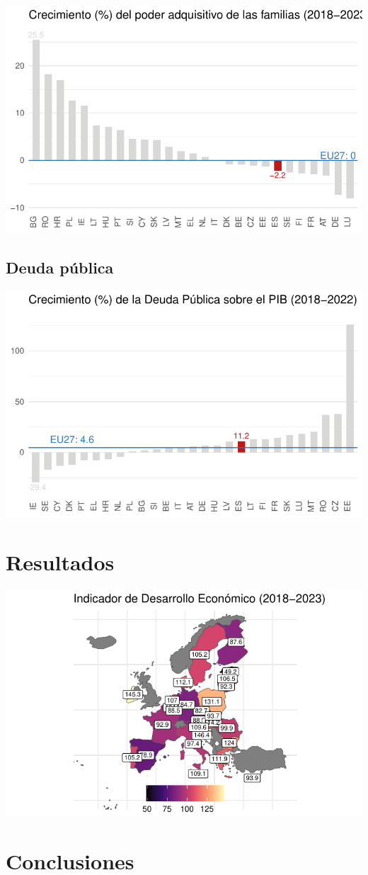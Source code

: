 \documentclass[
  letterpaper,
  DIV=11,
  numbers=noendperiod]{scrartcl}
\begin{document}
\includegraphics{Trabajo_files/figure-pdf/unnamed-chunk-27-1.pdf}

\hypertarget{deuda-puxfablica}{%
\subsection{Deuda pública}\label{deuda-puxfablica}}

\includegraphics{Trabajo_files/figure-pdf/unnamed-chunk-31-1.pdf}

\hypertarget{resultados}{%
\section{Resultados}\label{resultados}}

\includegraphics{Trabajo_files/figure-pdf/unnamed-chunk-36-1.pdf}

\hypertarget{conclusiones}{%
\section{Conclusiones}\label{conclusiones}}
\end{document}
